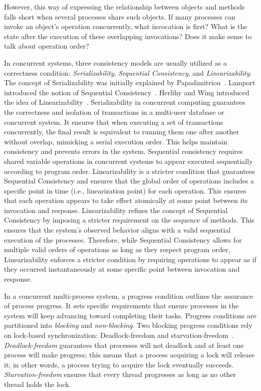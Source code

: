 However, this way of expressing the relationship between objects and methods falls short when several processes share such objects. If many processes can invoke an object's operation concurrently, what invocation is first? What is the state after the execution of these overlapping invocations? Does it make sense to talk about operation order?

In concurrent systems, three consistency models are usually utilized as a correctness condition: \textit{Serializability}, \textit{Sequential Consistency}, and \textit{Linearizability}. The concept of Serializability was initially explained by Papadimitriou~\cite{DBLP_journals_jacm_Papadimitriou79b}. Lamport introduced the notion of Sequential Consistency~\cite{lamport1979how}. Herlihy and Wing introduced the idea of Linearizability~\cite{DBLP_journals_toplas_HerlihyW90}.
Serializability in concurrent computing guarantees the correctness and isolation of transactions in a multi-user database or concurrent system. It ensures that when executing a set of transactions concurrently, the final result is equivalent to running them one after another without overlap, mimicking a serial execution order. This helps maintain consistency and prevents errors in the system.
Sequential consistency requires shared variable operations in concurrent systems to appear executed sequentially according to program order. Linearizability is a stricter condition that guarantees Sequential Consistency and ensures that the global order of operations includes a specific point in time (i.e., linearization point) for each operation. This ensures that each operation appears to take effect atomically at some point between its invocation and response. Linearizability refines the concept of Sequential Consistency by imposing a stricter requirement on the sequence of methods. This ensures that the system's observed behavior aligns with a valid sequential execution of the processes. Therefore, while Sequential Consistency allows for multiple valid orders of operations as long as they respect program order, Linearizability enforces a stricter condition by requiring operations to appear as if they occurred instantaneously at some specific point between invocation and response.

In a concurrent multi-process system, a progress condition outlines the assurance of process progress. It sets specific requirements that ensure processes in the system will keep advancing toward completing their tasks. Progress conditions are partitioned into \textit{blocking} and \textit{non-blocking}. Two blocking progress conditions rely on lock-based synchronization: Deadlock-freedom and starvation-freedom~\cite{DBLP_books_daglib_0020056}. \textit{Deadlock-freedom} guarantees that processes will not deadlock and at least one process will make progress; this means that a process acquiring a lock will release it; in other words, a process trying to acquire the lock eventually succeeds. \textit{Starvation-freedom} ensures that every thread progresses as long as no other thread holds the lock.

